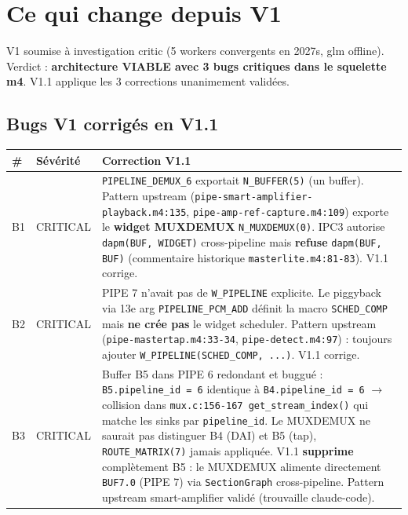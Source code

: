 \documentclass[11pt,a4paper]{article}
\begin{document}
\section{Ce qui change depuis V1}

V1 soumise à investigation critic (5 workers convergents en 2027s, glm offline). Verdict : \textbf{architecture VIABLE avec 3 bugs critiques dans le squelette m4}. V1.1 applique les 3 corrections unanimement validées.

\subsection{Bugs V1 corrigés en V1.1}

\begin{center}
\begin{tabularx}{\textwidth}{llX}
\toprule
\textbf{\#} & \textbf{Sévérité} & \textbf{Correction V1.1} \\
\midrule
B1 & CRITICAL & \texttt{PIPELINE\_DEMUX\_6} exportait \texttt{N\_BUFFER(5)} (un buffer). Pattern upstream (\texttt{pipe-smart-amplifier-playback.m4:135}, \texttt{pipe-amp-ref-capture.m4:109}) exporte le \textbf{widget MUXDEMUX} \texttt{N\_MUXDEMUX(0)}. IPC3 autorise \texttt{dapm(BUF, WIDGET)} cross-pipeline mais \textbf{refuse} \texttt{dapm(BUF, BUF)} (commentaire historique \texttt{masterlite.m4:81-83}). V1.1 corrige. \\
B2 & CRITICAL & PIPE 7 n'avait pas de \texttt{W\_PIPELINE} explicite. Le piggyback via 13e arg \texttt{PIPELINE\_PCM\_ADD} définit la macro \texttt{SCHED\_COMP} mais \textbf{ne crée pas} le widget scheduler. Pattern upstream (\texttt{pipe-mastertap.m4:33-34}, \texttt{pipe-detect.m4:97}) : toujours ajouter \texttt{W\_PIPELINE(SCHED\_COMP, ...)}. V1.1 corrige. \\
B3 & CRITICAL & Buffer B5 dans PIPE 6 redondant et buggué : \texttt{B5.pipeline\_id = 6} identique à \texttt{B4.pipeline\_id = 6} $\to$ collision dans \texttt{mux.c:156-167 get\_stream\_index()} qui matche les sinks par \texttt{pipeline\_id}. Le MUXDEMUX ne saurait pas distinguer B4 (DAI) et B5 (tap), \texttt{ROUTE\_MATRIX(7)} jamais appliquée. V1.1 \textbf{supprime} complètement B5 : le MUXDEMUX alimente directement \texttt{BUF7.0} (PIPE 7) via \texttt{SectionGraph} cross-pipeline. Pattern upstream smart-amplifier validé (trouvaille claude-code). \\
\bottomrule
\end{tabularx}
\end{center}
\end{document}
